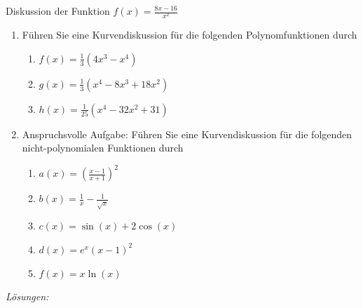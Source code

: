 \begin{bsp}
    {Diskussion der Funktion $f(x) = \frac{8x-16}{x^2}$}{}

    \phantom{Textfüler}

    \vspace*{12 cm}

    \pagebreak

    \phantom{Textfüller}

    \vspace*{21cm}

    \pagebreak

    \phantom{Textfüller}

    \vspace*{21cm}

\end{bsp}

\clearpage
\begin{ueb}
    {}{}
    \begin{enumerate}
        \item 
    Führen Sie eine Kurvendiskussion für die folgenden Polynomfunktionen durch
    \begin{enumerate}
        \item $f(x) = \frac{1}{3}\left(4x^3-x^4\right)$
        \item $g(x) = \frac{1}{3}\left(x^4-8x^3+18x^2\right)$
        \item $h(x) = \frac{1}{25}\left(x^4-32x^2+31\right)$
    \end{enumerate}
    \item Anspruchsvolle Aufgabe: Führen Sie eine Kurvendiskussion für die folgenden nicht-polynomialen Funktionen durch
    \begin{enumerate}
        \item $a(x) = \left(\frac{x-1}{x+1}\right)^2$
        \item $b(x) = \frac{1}{x} - \frac{1}{\sqrt x}$
        \item $c(x) = \sin(x) + 2\cos(x) $
        \item $d(x) = e^x (x-1)^2$
        \item $f(x) = x\ln(x)$
    \end{enumerate}
    \end{enumerate}
\end{ueb}

\clearpage
\emph{Lösungen:}


